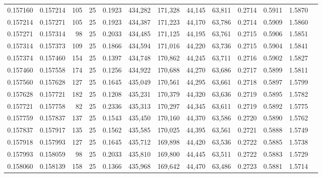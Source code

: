 \begin{tabular}{rrrrrrrrrrrrr}
0.157160 & 0.157214 &   105 &  25 &                                     0.1923 & 434,282 & 171,328 &  44,145 &  63,811 & 0.2714 & 0.5911 & 1.5870 \\
0.157214 & 0.157271 &   105 &  25 &                                     0.1923 & 434,387 & 171,223 &  44,170 &  63,786 & 0.2714 & 0.5909 & 1.5860 \\
0.157271 & 0.157314 &    98 &  25 &                                     0.2033 & 434,485 & 171,125 &  44,195 &  63,761 & 0.2715 & 0.5906 & 1.5851 \\
0.157314 & 0.157373 &   109 &  25 &                                     0.1866 & 434,594 & 171,016 &  44,220 &  63,736 & 0.2715 & 0.5904 & 1.5841 \\
0.157374 & 0.157460 &   154 &  25 &                                     0.1397 & 434,748 & 170,862 &  44,245 &  63,711 & 0.2716 & 0.5902 & 1.5827 \\
0.157460 & 0.157558 &   174 &  25 &                                     0.1256 & 434,922 & 170,688 &  44,270 &  63,686 & 0.2717 & 0.5899 & 1.5811 \\
0.157560 & 0.157628 &   127 &  25 &                                     0.1645 & 435,049 & 170,561 &  44,295 &  63,661 & 0.2718 & 0.5897 & 1.5799 \\
0.157628 & 0.157721 &   182 &  25 &                                     0.1208 & 435,231 & 170,379 &  44,320 &  63,636 & 0.2719 & 0.5895 & 1.5782 \\
0.157721 & 0.157758 &    82 &  25 &                                     0.2336 & 435,313 & 170,297 &  44,345 &  63,611 & 0.2719 & 0.5892 & 1.5775 \\
0.157759 & 0.157837 &   137 &  25 &                                     0.1543 & 435,450 & 170,160 &  44,370 &  63,586 & 0.2720 & 0.5890 & 1.5762 \\
0.157837 & 0.157917 &   135 &  25 &                                     0.1562 & 435,585 & 170,025 &  44,395 &  63,561 & 0.2721 & 0.5888 & 1.5749 \\
0.157918 & 0.157993 &   127 &  25 &                                     0.1645 & 435,712 & 169,898 &  44,420 &  63,536 & 0.2722 & 0.5885 & 1.5738 \\
0.157993 & 0.158059 &    98 &  25 &                                     0.2033 & 435,810 & 169,800 &  44,445 &  63,511 & 0.2722 & 0.5883 & 1.5729 \\
0.158060 & 0.158139 &   158 &  25 &                                     0.1366 & 435,968 & 169,642 &  44,470 &  63,486 & 0.2723 & 0.5881 & 1.5714 \\

\end{tabular}

